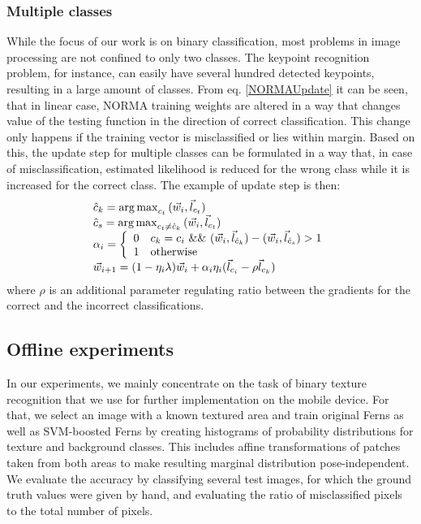 \subsubsection{Multiple classes}
\label{multiclass}
While the focus of our work is on binary classification, most problems in image processing are not confined to only two classes. The keypoint recognition problem, for instance, can easily have several hundred detected keypoints, resulting in a large amount of classes. 
From eq. \ref{NORMAUpdate} it can be seen, that in linear case, NORMA training weights are altered in a way that changes value of the testing function in the direction of correct classification. This change only happens if the training vector is misclassified or lies within margin. Based on this, the update step for multiple classes can be formulated in a way that, in case of misclassification, estimated likelihood is reduced for the wrong class while it is increased for the correct class. The example of update step is then:
\begin{equation}
\begin{array}{l}
\hat{c}_k=\operatorname*{arg\,max}_{c_t}{ (\vec{w}_{i},\vec{l}_{c_t})}\\
\hat{c}_s=\operatorname*{arg\,max}_{c_t\ne\hat{c}_k}{ (\vec{w}_{i},\vec{l}_{c_t})}\\
\alpha_i=\left\{ \begin{array}{rl}
0 &  c_k=c_i \mbox{ \&\& } (\vec{w}_{i},\vec{l}_{\hat{c}_k})-(\vec{w}_{i},\vec{l}_{\hat{c}_s})>1 \\
1 & \mbox{otherwise}
\end{array} \right.\\
\vec{w}_{i+1}=(1-\eta_i \lambda )\vec{w}_i +\alpha_i \eta_i (\vec{l}_{c_i}-\rho \vec{l}_{c_k}) \\
\end{array}
\label{multic}
\end{equation}
where $\rho$ is an additional parameter regulating ratio between the gradients for the correct and the incorrect classifications. 
\subsection{Offline experiments}
\label{exp1}
In our experiments, we mainly concentrate on the task of binary texture recognition that we use for further implementation on the mobile device.
For that, we select an image with a known textured area and train original Ferns as well as SVM-boosted Ferns by creating histograms of probability distributions for texture and background classes. This includes affine transformations of patches taken from both areas to make resulting marginal distribution pose-independent. We evaluate the accuracy by classifying several test images, for which the ground truth values were given by hand, and evaluating the ratio of misclassified pixels to the total number of pixels.


